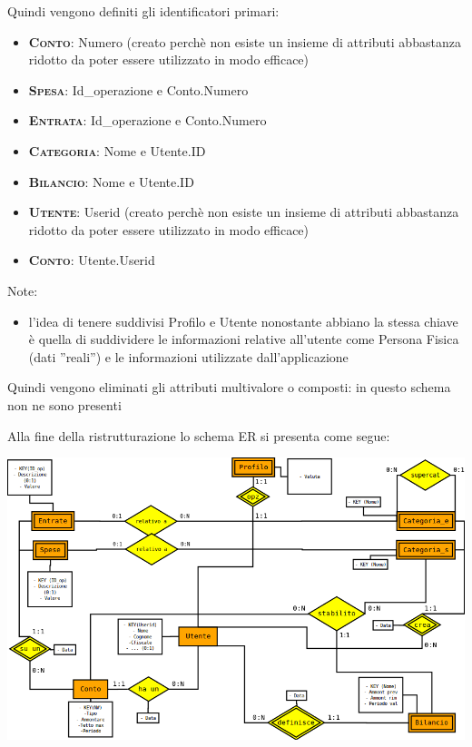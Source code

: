 \documentclass[a4paper,10pt]{article}
\newcommand{\entita}[1]{\textsc{\textbf{#1}}}
\begin{document}
Quindi vengono definiti gli identificatori primari:
\begin{itemize}
\item \entita{Conto}: Numero (creato perchè non esiste un insieme di attributi abbastanza ridotto da poter essere utilizzato in modo efficace)
\item \entita{Spesa}: Id\_{}operazione e Conto.Numero
\item \entita{Entrata}: Id\_{}operazione e Conto.Numero
\item \entita{Categoria}: Nome e Utente.ID
\item \entita{Bilancio}: Nome e Utente.ID
\item \entita{Utente}: Userid (creato perchè non esiste un insieme di attributi abbastanza ridotto da poter essere utilizzato in modo efficace)
\item \entita{Conto}: Utente.Userid
\end{itemize}
Note:
\begin{itemize}
\item l'idea di tenere suddivisi Profilo e Utente nonostante abbiano la stessa chiave è quella di suddividere le informazioni relative all'utente come Persona Fisica (dati ''reali'') e le informazioni utilizzate dall'applicazione

\end{itemize}

Quindi vengono eliminati gli attributi multivalore o composti:
in questo schema non ne sono presenti

Alla fine della ristrutturazione lo schema ER si presenta come segue:

\centerline{\includegraphics[scale=0.65]{ERpost.png}}
\end{document}
